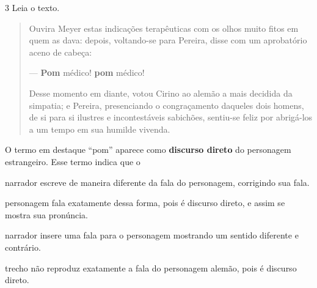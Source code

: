 \num{3} Leia o texto.

\begin{quote}
Ouvira Meyer estas indicações terapêuticas com os olhos muito fitos em
quem as dava: depois, voltando-se para Pereira, disse com um aprobatório
aceno de cabeça:

--- \textbf{Pom} médico! \textbf{pom} médico!

Desse momento em diante, votou Cirino ao alemão a mais decidida da
simpatia; e Pereira, presenciando o congraçamento daqueles dois homens,
de si para si ilustres e incontestáveis sabichões, sentiu-se feliz por
abrigá-los a um tempo em sua humilde vivenda.

\end{quote}

O termo em destaque ``pom'' aparece como \textbf{discurso direto} do
personagem estrangeiro. Esse termo indica que o

\begin{escolha}
\item narrador escreve de maneira diferente da fala do personagem,
corrigindo sua fala.

\item personagem fala exatamente dessa forma, pois é discurso direto,
e assim se mostra sua pronúncia.

\item narrador insere uma fala para o personagem mostrando um sentido
diferente e contrário.

\item trecho não reproduz exatamente a fala do personagem alemão,
pois é discurso direto.
\end{escolha}


